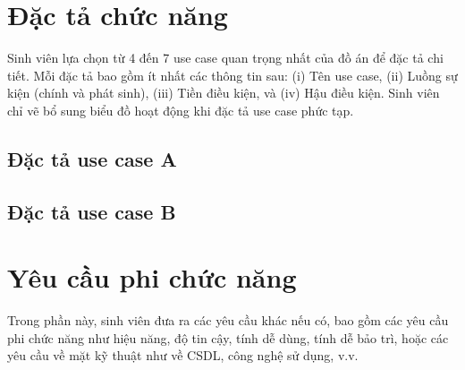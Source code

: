 \documentclass[../DoAn.tex]{subfiles}
\begin{document}
\section{Đặc tả chức năng}
\label{section:2.3}
Sinh viên lựa chọn từ 4 đến 7 use case quan trọng nhất của đồ án để đặc tả chi tiết. Mỗi đặc tả bao gồm ít nhất các thông tin sau: (i) Tên use case, (ii) Luồng sự kiện (chính và phát sinh), (iii) Tiền điều kiện, và (iv) Hậu điều kiện. Sinh viên chỉ vẽ bổ sung biểu đồ hoạt động khi đặc tả use case phức tạp.
\subsection{Đặc tả use case A}
\hfill
\subsection{Đặc tả use case B}
\hfill

\section{Yêu cầu phi chức năng}
\label{section:2.4}
Trong phần này, sinh viên đưa ra các yêu cầu khác nếu có, bao gồm các yêu cầu phi chức năng như hiệu năng, độ tin cậy, tính dễ dùng, tính dễ bảo trì, hoặc các yêu cầu về mặt kỹ thuật như về CSDL, công nghệ sử dụng, v.v.


\end{document}
